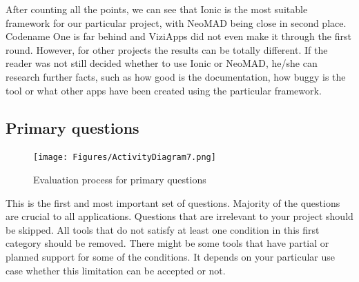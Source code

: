 \documentclass[english,master,public,dept460,male,cpdeclaration,oneside]{diploma}
\begin{document}
After counting all the points, we can see that Ionic is the most suitable framework for our particular project, with NeoMAD being close in second place. Codename One is far behind and ViziApps did not even make it through the first round. However, for other projects the results can be totally different. If the reader was not still decided whether to use Ionic or NeoMAD, he/she can research further facts, such as how good is the documentation, how buggy is the tool or what other apps have been created using the particular framework.

\subsection{Primary questions}

\begin{figure}
	\centering\texttt{[image: Figures/ActivityDiagram7.png]}
	\caption{Evaluation process for primary questions}
	\label{figure:activityPrimary}
\end{figure}

This is the first and most important set of questions. Majority of the questions are crucial to all applications. Questions that are irrelevant to your project should be skipped. All tools that do not satisfy at least one condition in this first category should be removed. There might be some tools that have partial or planned support for some of the conditions. It depends on your particular use case whether this limitation can be accepted or not. 
\end{document}
